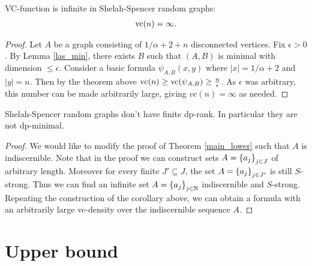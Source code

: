 \begin{Corollary}
  VC-function is infinite in Shelah-Spencer random graphs:
  \begin{align*}
    \operatorname{vc}(n) = \infty.
  \end{align*}
\end{Corollary}

\begin{proof}
  Let $A$ be a graph consisting of $1/\alpha + 2 + n$ disconnected vertices.
  Fix $\epsilon > 0$.
  By Lemma \ref{las_min}, there exists $B$ such that $(A, B)$ is minimal with dimension $\leq \epsilon$.
  Consider a basic formula $\psi_{A, B}(x, y)$ where $|x| = 1/\alpha + 2$ and $|y| = n$.
  Then by the theorem above $\operatorname{vc}(n) \geq \operatorname{vc} (\psi_{A,B}) \geq \frac{n}{\epsilon}$.
  As $\epsilon$ was arbitrary, this number can be made arbitrarily large, giving $vc(n) = \infty$ as needed.
\end{proof}

\begin{Corollary}
  Shelah-Spencer random graphs don't have finite dp-rank.
  In particular they are not dp-minimal.
\end{Corollary}

\begin{proof}
  We would like to modify the proof of Theorem \ref{main_lower} such that $A$ is indiscernible.
  Note that in the proof we can construct sets $A = \left\{a_j\right\}_{j \in J}$ of arbitrary length.
  Moreover for every finite $J' \subseteq J$, the set $A = \left\{a_j\right\}_{j \in J'}$ is still $S$-strong.
  Thus we can find an infinite set $A = \left\{a_j\right\}_{j \in \mathbb{N}}$ indiscernible and $S$-strong.
  Repeating the construction of the corollary above,
  we can obtain a formula with an arbitrarily large vc-density over the indiscernible sequence $A$.
\end{proof}



\section{Upper bound}

